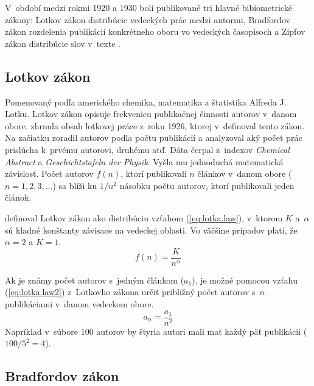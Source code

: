 V~období medzi rokmi 1920 a 1930 boli publikované tri hlavné bibiometrické
zákony: Lotkov zákon distribúcie vedeckých prác medzi autormi, Bradfordov zákon
rozdelenia publikácií konkrétneho oboru vo vedeckých časopisoch a Zipfov
zákon
distribúcie slov v~texte \citep{Bellis2009}.


\subsection{Lotkov zákon}

Pomenovaný podľa amerického chemika, matematika a štatistika Alfreda J.\,Lotku.
Lotkov zákon opisuje frekvenicu publikačnej činnosti autorov v~danom obore.
\citet{Ondrisova2011} zhrnula obsah lotkovej práce z~roku 1926, ktorej
v~definoval tento zákon.  Na začiatku zoradil autorov podľa počtu publikácií a
analyzoval aký počet prác prislúcha k~prvému autorovi, druhému atď.  Dáta čerpal
z~indexov \emph{Chemical Abstract} a \emph{Geschichtstafeln der Physik}.  Vyšla
mu jednoduchá matematická závislosť.  Počet autorov $f(n)$, ktorí publikovali
$n$ článkov v~danom obore ($n = 1, 2, 3, \dots$) sa blíži ku $1/n^2$ násobku
počtu autorov, ktorí publikovali jeden článok.

\citet{Egghe2005} definoval Lotkov zákon ako distribúciu vzťahom
(\ref{eq:lotka.law}), v~ktorom $K$ a~$\alpha$ sú kladné konštanty závisace
na vedeckej oblasti.  Vo väčšine prípadov platí, že $\alpha = 2$ a $K = 1$.
\begin{equation}
\label{eq:lotka.law}
f(n) = \frac{K}{n^\alpha}
\end{equation}

Ak je známy počet autorov s~jedným článkom ($a_1$), je možné pomocou vzťahu
(\ref{eq:lotka.law2}) z~Lotkovho zákona určiť približný počet autorov s~$n$
publikáciami v~danom vedeckom obore.
\begin{equation}
\label{eq:lotka.law2}
a_n = \frac{a_1}{n^2}
\end{equation}
Napríklad v~súbore 100 autorov by štyria autori mali mať každý päť publikácii
($100/5^2 = 4$).


\subsection{Bradfordov zákon}

